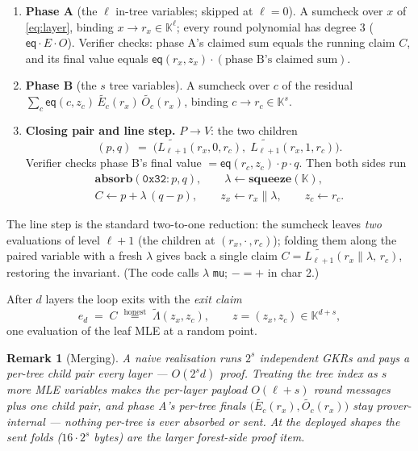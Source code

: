 \documentclass[11pt]{article}
\newcommand{\K}{\mathbb{K}}            %
\newcommand{\mle}[1]{\widetilde{#1}}
\newcommand{\eq}{\mathsf{eq}}
\newcommand{\absorb}{\textbf{absorb}}
\newcommand{\squeeze}{\textbf{squeeze}}
\newcommand{\code}[1]{{\def\_{\textunderscore\allowbreak}\texttt{#1}}}
\newtheorem{remark}{Remark}
\theoremstyle{definition}
\begin{document}
\begin{enumerate}[leftmargin=2.2em, itemsep=2pt]
\item \textbf{Phase A} (the $\ell$ in-tree variables; skipped at
  $\ell = 0$).  A sumcheck over $x$ of \eqref{eq:layer}, binding
  $x \to r_x \in \K^\ell$; every round polynomial has degree 3
  ($\eq \cdot E \cdot O$).  Verifier checks: phase A's claimed sum
  equals the running claim $C$, and its final value equals
  $\eq(r_x, z_x) \cdot (\text{phase B's claimed sum})$.
\item \textbf{Phase B} (the $s$ tree variables).  A sumcheck over $c$
  of the residual $\sum_c \eq(c, z_c)\, \mle{E_c}(r_x)\,
  \mle{O_c}(r_x)$, binding $c \to r_c \in \K^s$.
\item \textbf{Closing pair and line step.}
  $P \to V$: the two children
  \[
    (p, q) \;=\; \big(\mle{L_{\ell+1}}(r_x, 0, r_c),\;
                      \mle{L_{\ell+1}}(r_x, 1, r_c)\big).
  \]
  Verifier checks phase B's final value $= \eq(r_c, z_c)\cdot p\cdot q$.
  Then both sides run
  \[
  \begin{gathered}
    \absorb(\mathtt{0x32}: p, q), \qquad
    \lambda \leftarrow \squeeze(\K), \\
    C \leftarrow p + \lambda\,(q - p), \qquad
    z_x \leftarrow r_x \| \lambda, \qquad
    z_c \leftarrow r_c .
  \end{gathered}
  \]
\end{enumerate}

The line step is the standard two-to-one reduction: the sumcheck leaves
\emph{two} evaluations of level $\ell+1$ (the children at
$(r_x, \cdot\,, r_c)$); folding them along the paired variable with a
fresh $\lambda$ gives back a single claim
$C = \mle{L_{\ell+1}}(r_x \| \lambda,\, r_c)$, restoring the invariant.
(The code calls $\lambda$ \code{mu}; $- = +$ in char 2.)

After $d$ layers the loop exits with the \emph{exit claim}
\[
  e_d \;=\; C \;\overset{\text{honest}}{=}\; \mle{\Lambda}(z_x, z_c),
  \qquad z = (z_x, z_c) \in \K^{d+s},
\]
one evaluation of the leaf MLE at a random point.

\begin{remark}[Merging]
A naive realisation runs $2^s$ independent GKRs and pays a per-tree
child pair every layer --- $O(2^s d)$ proof.  Treating the tree index as
$s$ more MLE variables makes the per-layer payload $O(\ell + s)$ round
messages plus \emph{one} child pair, and phase A's per-tree finals
$\big(\mle{E_c}(r_x), \mle{O_c}(r_x)\big)$ stay prover-internal ---
nothing per-tree is ever absorbed or sent.  At the deployed shapes the
sent folds ($16 \cdot 2^s$ bytes) are the larger forest-side proof item.
\end{remark}
\end{document}
